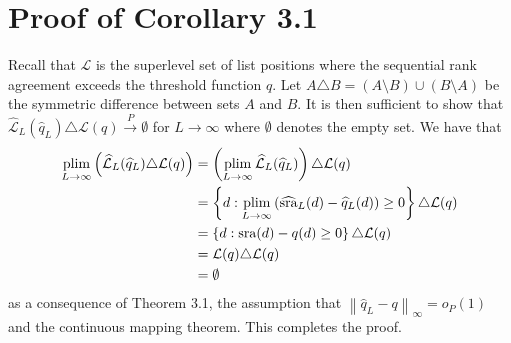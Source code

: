 \documentclass[oupdraft]{bio}
\newcommand{\nn}{\nonumber}
\newcommand{\plim}{\operatornamewithlimits{plim}}
\begin{document}
\section{Proof of Corollary 3.1}
\label{sec:appB}
Recall that $\mathcal{L}$ is the superlevel set of list positions
where the sequential rank agreement exceeds the threshold function
$q$. Let $A \triangle B = (A \setminus B) \cup (B \setminus A)$ be the
symmetric difference between sets $A$ and $B$. It is then sufficient
to show that $\widehat{\mathcal{L}}_L(\widehat{q}_L) \triangle \mathcal{L}(q) \overset{P}{\longrightarrow} \emptyset$
for $L \rightarrow \infty$ where $\emptyset$ denotes the empty set.
We have that
\begin{align}
  \plim_{L \rightarrow \infty}\left(\widehat{\mathcal{L}}_L(\widehat{q}_L) \triangle \mathcal{L}(q)\right) &=   \left(\plim_{L \rightarrow \infty}\widehat{\mathcal{L}}_L(\widehat{q}_L)\right) \triangle \mathcal{L}(q)\\
  &= \left\{d : \plim_{L\rightarrow \infty} \left(\widehat{\textrm{sra}}_L(d) - \widehat{q}_L(d)\right)\geq 0\right\} \triangle \mathcal{L}(q)\nn\\
  &= \left\{d : \textrm{sra}(d) - q(d) \geq 0\right\}\triangle \mathcal{L}(q)\nn\\
  &= \mathcal{L}(q)\triangle \mathcal{L}(q)\nn\\
  &= \emptyset\nn
\end{align}
as a consequence of Theorem 3.1, the assumption that $\left\|\widehat{q}_L - q\right\|_\infty = o_P(1)$ and the continuous mapping theorem. This completes the proof.
\end{document}
